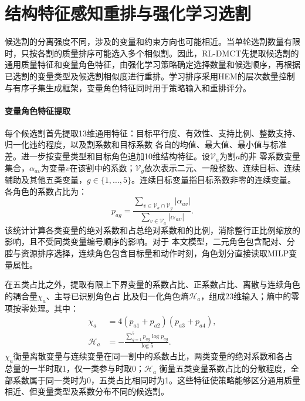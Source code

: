 \section{结构特征感知重排与强化学习选割}
\label{sec:hem-extension-cn}

候选割的分离强度不同，涉及的变量和约束方向也可能相近。当单轮选割数量有限时，只按各割的质量排序可能选入多个相似割。因此，RL-DMCT先提取候选割的通用质量特征和变量角色特征，由强化学习策略确定选择数量和候选顺序，再根据已选割的变量类型及候选割相似度进行重排。学习排序采用HEM的层次数量控制与有序子集生成框架\citep{wang2023hem}，变量角色特征同时用于策略输入和重排评分。

\paragraph{变量角色特征提取}
每个候选割首先提取13维通用特征：目标平行度、有效性、支持比例、整数支持、归一化违约程度，以及割系数和目标系数
各自的均值、最大值、最小值与标准差。进一步按变量类型和目标角色追加10维结构特征。设$\mathcal V_a$为割$a$的非
零系数变量集合，$\alpha_{av}$为变量$v$在该割中的系数；$\mathcal V_g$依次表示二元、一般整数、连续目标、连续
辅助及其他五类变量，$g\in\{1,\ldots,5\}$。连续目标变量指目标系数非零的连续变量。各角色的系数占比为：
\begin{equation}
p_{ag}=\frac{\sum_{v\in\mathcal V_a\cap\mathcal V_g}|\alpha_{av}|}
{\sum_{v\in\mathcal V_a}|\alpha_{av}|}.
\label{eq:role-profile-cn}
\end{equation}
该统计计算各类变量的绝对系数和占总绝对系数和的比例，消除整行正比例缩放的影响，且不受同类变量编号顺序的影响。对于
本文模型，二元角色包含配对、分腔与资源排序选择，连续角色包含目标量和动作时刻，角色划分直接读取MILP变量属性。

在五类占比之外，提取有限上下界变量的系数占比、正系数占比、离散与连续角色的耦合量$\chi_a$、主导已识别角色占
比及归一化角色熵$\mathcal H_a$，组成23维输入；熵中的零项按零处理。其中：
\begin{equation}
\begin{aligned}
\chi_a&=4(p_{a1}+p_{a2})(p_{a3}+p_{a4}),\\
\mathcal H_a&=-\frac{\sum_{g=1}^{5}p_{ag}\log p_{ag}}{\log5}.
\end{aligned}
\label{eq:role-information-cn}
\end{equation}
$\chi_a$衡量离散变量与连续变量在同一割中的系数占比，两类变量的绝对系数和各占总量的一半时取1，仅一类参与时取0；$\mathcal H_a$
衡量五类变量系数占比的分散程度，全部系数属于同一类时为0，五类占比相同时为1。这些特征使策略能够区分通用质量相近、但变量类型及系数分布不同的候选割。

